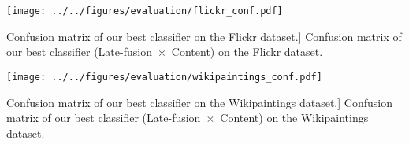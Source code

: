 \begin{figure*}[h!]
\centering
\texttt{[image: ../../figures/evaluation/flickr\_conf.pdf]}
\caption
[Confusion matrix of our best classifier on the Flickr dataset.]
{Confusion matrix of our best classifier (\mbox{Late-fusion $\times$ Content}) on the Flickr dataset.}
\label{fig:flickr_conf}
\end{figure*}

\begin{figure*}[h!]
\centering
\texttt{[image: ../../figures/evaluation/wikipaintings\_conf.pdf]}
\caption
[Confusion matrix of our best classifier on the Wikipaintings dataset.]
{Confusion matrix of our best classifier (\mbox{Late-fusion $\times$ Content}) on the Wikipaintings dataset.}
\label{fig:wp_conf}
\end{figure*}
